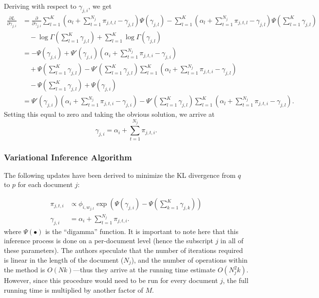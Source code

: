 \documentclass[11pt]{article}
\begin{document}
Deriving with respect to $\gamma_{j,i}$, we get
\begin{align*}
  \frac{\partial L}{\partial \gamma_{j,i}}
  &=
  \frac{\partial}{\partial \gamma_{j,i}}
  \sum_{l=1}^K \left(\alpha_l + \sum_{t=1}^{N_j} \pi_{j,t,l} -
    \gamma_{j,l}\right)
  \Psi(\gamma_{j,l})
  -
  \sum_{l=1}^K \left(\alpha_l + \sum_{t=1}^{N_j} \pi_{j,t,l} -
    \gamma_{j,l}\right)
  \Psi(\sum_{l=1}^K \gamma_{j,l})
  \\&\quad-
  \log \Gamma\left(\sum_{l=1}^K \gamma_{j,l}\right)
  +
  \sum_{l=1}^K \log \Gamma\left(\gamma_{j,l}\right)
  \\&=
  -\Psi(\gamma_{j,i}) + \Psi'(\gamma_{j,i})\left(\alpha_i + \sum_{t=1}^{N_j}
  \pi_{j,t,i} - \gamma_{j,i}\right)
  \\&\quad+
  \Psi\left(\sum_{l=1}^K \gamma_{j,l}\right)
  - \Psi'\left(\sum_{l=1}^K \gamma_{j,l}\right)\sum_{l=1}^K \left(
    \alpha_l + \sum_{t=1}^{N_j} \pi_{j,t,i} - \gamma_{j,l}
  \right)
  \\&\quad-
  \Psi\left(\sum_{l=1}^K \gamma_{j,l} \right)
  + \Psi(\gamma_{j,i})
  \\&=
  \Psi'(\gamma_{j,i})\left(
    \alpha_i + \sum_{t=1}^{N_j} \pi_{j,t,i} - \gamma_{j,i}
  \right)
  - \Psi'\left(\sum_{l=1}^K \gamma_{j,l}\right)\sum_{l=1}^K \left(
    \alpha_l + \sum_{t=1}^{N_j} \pi_{j,t,i} - \gamma_{j,l}
  \right).
\end{align*}
Setting this equal to zero and taking the obvious solution, we arrive at
\begin{equation}
  \gamma_{j,i} = \alpha_i + \sum_{t=1}^{N_j} \pi_{j,t,i}.
\end{equation}

\subsubsection{Variational Inference Algorithm}
\label{sec:var-inf-alg}

The following updates have been derived to minimize the KL divergence from
$q$ to $p$ for each document $j$:

\begin{align}
  \pi_{j,t,i} &\propto \phi_{i,w_{j,t}} \exp\left(\Psi(\gamma_{j,i}) -
  \Psi\left(\sum_{k=1}^K \gamma_{j,k}\right)\right)\\
  \gamma_{j,i} &= \alpha_i + \sum_{t=1}^{N_j} \pi_{j,t,i}.
\end{align}
where $\Psi(\bullet)$ is the ``digamma'' function. It is important to note
here that this inference process is done on a per-document level (hence the
subscript $j$ in all of these parameters). The authors speculate that the
number of iterations required is linear in the length of the document
($N_j$), and the number of operations within the method is $O(Nk)$---thus
they arrive at the running time estimate $O(N_j^2 k)$. However, since this
procedure would need to be run for every document $j$, the full running
time is multiplied by another factor of $M$.
\end{document}
